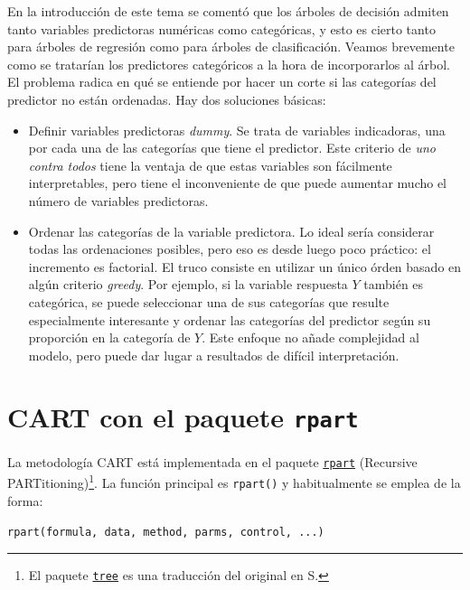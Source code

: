 \documentclass[
  spanish,
]{book}
\theoremstyle{break}
\theoremstyle{definition}
\theoremstyle{definition}
\theoremstyle{definition}
\theoremstyle{remark}
\begin{document}
En la introducción de este tema se comentó que los árboles de decisión admiten tanto variables predictoras numéricas como categóricas, y esto es cierto tanto para árboles de regresión como para árboles de clasificación. Veamos brevemente como se tratarían los predictores categóricos a la hora de incorporarlos al árbol. El problema radica en qué se entiende por hacer un corte si las categorías del predictor no están ordenadas. Hay dos soluciones básicas:

\begin{itemize}
\item
  Definir variables predictoras \emph{dummy}. Se trata de variables indicadoras, una por cada una de las categorías que tiene el predictor. Este criterio de \emph{uno contra todos} tiene la ventaja de que estas variables son fácilmente interpretables, pero tiene el inconveniente de que puede aumentar mucho el número de variables predictoras.
\item
  Ordenar las categorías de la variable predictora. Lo ideal sería considerar todas las ordenaciones posibles, pero eso es desde luego poco práctico: el incremento es factorial. El truco consiste en utilizar un único órden basado en algún criterio \emph{greedy}. Por ejemplo, si la variable respuesta \(Y\) también es categórica, se puede seleccionar una de sus categorías que resulte especialmente interesante y ordenar las categorías del predictor según su proporción en la categoría de \(Y\). Este enfoque no añade complejidad al modelo, pero puede dar lugar a resultados de difícil interpretación.
\end{itemize}

\hypertarget{cart-con-el-paquete-rpart}{%
\section{\texorpdfstring{CART con el paquete \texttt{rpart}}{CART con el paquete rpart}}\label{cart-con-el-paquete-rpart}}

La metodología CART está implementada en el paquete \href{https://CRAN.R-project.org/package=rpart}{\texttt{rpart}}
(Recursive PARTitioning)\footnote{El paquete \href{https://CRAN.R-project.org/package=tree}{\texttt{tree}} es una traducción del original en S.}.
La función principal es \texttt{rpart()} y habitualmente se emplea de la forma:

\texttt{rpart(formula,\ data,\ method,\ parms,\ control,\ ...)}
\end{document}
